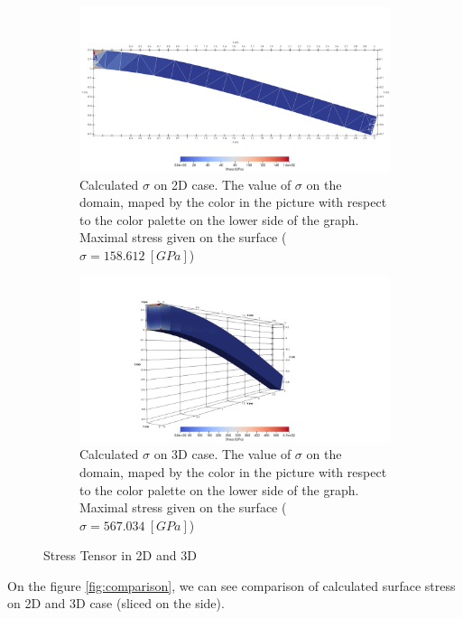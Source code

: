\documentclass[a4paper,11pt]{article}
\begin{document}
\begin{figure}[h!]
	\begin{subfigure}[b]{0.5\linewidth}
		\centering
		\includegraphics[width=\linewidth]{picture/conference/2dstress}
		\caption{Calculated $\sigma$ on 2D case. The value of $\sigma$ on the domain, maped by the color in the picture with respect to the color palette on the lower side of the graph. Maximal stress given on the surface ($\sigma = 158.612\ [GPa]$)}
		\label{fig:2dstress}
	\end{subfigure}
\quad
	\begin{subfigure}[b]{0.5\linewidth}
		\centering
		\includegraphics[width=\linewidth]{picture/conference/3dstress}
		\caption{Calculated $\sigma$ on 3D case. The value of $\sigma$ on the domain, maped by the color in the picture with respect to the color palette on the lower side of the graph. Maximal stress given on the surface ($\sigma = 567.034\ [GPa]$)}
		\label{fig:3dstress}
	\end{subfigure}
\caption{Stress Tensor in 2D and 3D}
\label{fig:stresstensor}
\end{figure}
\newpage
On the figure \ref{fig:comparison}, we can see comparison of calculated surface stress on 2D and 3D case (sliced on the side).
\end{document}
